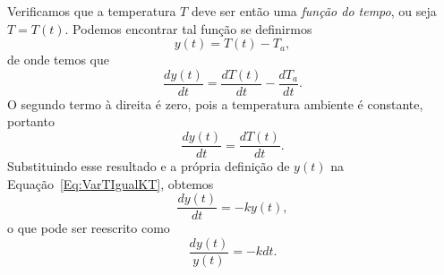 Verificamos que a temperatura $T$ deve ser então uma \emph{função do tempo}, ou seja $T = T(t)$. Podemos encontrar tal função se definirmos
\begin{equation}
	y(t) = T(t) - T_a,
\end{equation}
%
de onde temos que
\begin{equation}
	\frac{dy(t)}{dt} = \frac{dT(t)}{dt} - \frac{dT_a}{dt}.
\end{equation}
%
O segundo termo à direita é zero, pois a temperatura ambiente é constante, portanto
\begin{equation}
	\frac{dy(t)}{dt} = \frac{dT(t)}{dt}.
\end{equation}
%
Substituindo esse resultado e a própria definição de $y(t)$ na Equação~\ref{Eq:VarTIgualKT}, obtemos
\begin{equation}
	\frac{dy(t)}{dt} = -ky(t),
\end{equation}
%
o que pode ser reescrito como
\begin{equation}
	\frac{dy(t)}{y(t)} = -k dt.
\end{equation}

